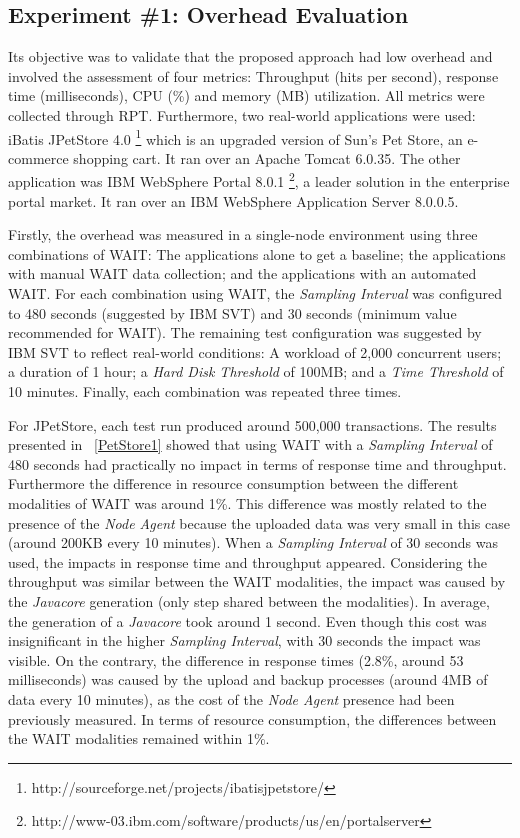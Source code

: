 \documentclass[runningheads,a4paper]{llncs}
\begin{document}
\subsection{Experiment \#1: Overhead Evaluation}
\vspace{-2pt}

Its objective was to validate that the proposed approach had low overhead and
involved the assessment of four metrics: Throughput (hits per second), response
time (milliseconds), CPU (\%) and memory (MB) utilization. All metrics were
collected through RPT. Furthermore, two real-world applications were used:
iBatis JPetStore 4.0 \footnote{http://sourceforge.net/projects/ibatisjpetstore/}
which is an upgraded version of Sun's Pet Store, an e-commerce shopping cart. It
ran over an Apache Tomcat 6.0.35. 
The other application was IBM WebSphere Portal 
8.0.1 \footnote{http://www-03.ibm.com/software/products/us/en/portalserver},
a leader solution in the enterprise portal market.  
It ran over an IBM WebSphere Application Server 8.0.0.5.

Firstly, the overhead was measured in a single-node environment using three
combinations of WAIT: The applications alone to get a baseline; the applications
with manual WAIT data collection; and the applications with an automated WAIT.
For each combination using WAIT, the \emph{Sampling Interval} was configured
to 480 seconds (suggested by IBM SVT) and 30 seconds (minimum value recommended for
WAIT). The remaining test configuration was suggested by IBM SVT to
reflect real-world conditions: A workload of 2,000 concurrent users; a duration
of 1 hour; a \emph{Hard Disk Threshold} of 100MB; and a \emph{Time Threshold} of
10 minutes. Finally, each combination was repeated three times.

For JPetStore, each test run produced around 500,000 transactions. The results
presented in \tablename ~\ref{PetStore1} showed that using WAIT with a
\emph{Sampling Interval} of 480 seconds had practically no impact in terms of
response time and throughput. Furthermore the difference in resource consumption
between the different modalities of WAIT was around 1\%.  This difference was
mostly related to the presence of the \emph{Node Agent} because the uploaded
data was very small in this case (around 200KB every 10 minutes). When a
\emph{Sampling Interval} of 30 seconds was used, the impacts in response time
and throughput appeared. Considering the throughput was similar between the WAIT
modalities, the impact was caused by the \emph{Javacore} generation (only step
shared between the modalities). In average, the generation of a \emph{Javacore}
took around 1 second. Even though this cost was insignificant in the higher
\emph{Sampling Interval}, with 30 seconds the impact was visible. On the
contrary, the difference in response times (2.8\%, around 53 milliseconds) was
caused by the upload and backup processes (around 4MB of data every 10 minutes),
as the cost of the \emph{Node Agent} presence had been previously measured. In
terms of resource consumption, the differences between the WAIT modalities
remained within 1\%.
\end{document}
